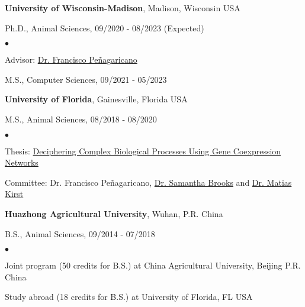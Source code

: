 \documentclass[margin,line,10pt]{res}
\newenvironment{list1}{
  \begin{list}{\ding{113}}{%
      \setlength{\itemsep}{0in}
      \setlength{\parsep}{0in} \setlength{\parskip}{0in}
      \setlength{\topsep}{0in} \setlength{\partopsep}{0in} 
      \setlength{\leftmargin}{0.17in}}}{\end{list}}
\newenvironment{list2}{
  \begin{list}{$\bullet$}{%
      \setlength{\itemsep}{0in}
      \setlength{\parsep}{0in} \setlength{\parskip}{0in}
      \setlength{\topsep}{0in} \setlength{\partopsep}{0in} 
      \setlength{\leftmargin}{0.2in}}}{\end{list}}
\begin{document}
\begin{resume}
{\bf University of Wisconsin-Madison}, Madison, Wisconsin USA\\
\vspace*{-.1in}
\begin{list1}
\item[] Ph.D., Animal Sciences, 09/2020 - 08/2023 (Expected)
\begin{list2}
\vspace*{.05in}
\item Advisor: \textcolor{blue}{\href{https://andysci.wisc.edu/directory/francisco-penagaricano/}{Dr. Francisco Peñagaricano}} 
\end{list2}
\vspace*{.03in}
\item[] M.S., Computer Sciences, 09/2021 - 05/2023
\vspace*{.03in}
\end{list1}

{\bf University of Florida}, Gainesville, Florida USA\\
\vspace*{-.1in}
\begin{list1}
\item[] M.S., Animal Sciences,  08/2018 - 08/2020
\begin{list2}
\vspace*{.05in}
\item Thesis: \textcolor{blue}{\href{https://ufdcimages.uflib.ufl.edu/UF/E0/05/69/10/00001/Liu_L.pdf}{Deciphering Complex Biological Processes Using Gene Coexpression Networks }} 
\item Committee: Dr. Francisco Peñagaricano, \textcolor{blue}{\href{https://animal.ifas.ufl.edu/people/samantha-brooks/}{Dr. Samantha Brooks}} and \textcolor{blue}{\href{https://ffgs.ifas.ufl.edu/faculty/kirst-matias/}{Dr. Matias Kirst}} 
\end{list2}
\vspace*{.02in}
\end{list1}

{\bf Huazhong Agricultural University}, Wuhan, P.R. China\\
\vspace*{-.1in}
\begin{list1}
\item[] B.S., Animal Sciences, 09/2014 - 07/2018
\begin{list2}
\vspace*{.05in}
\item Joint program (50 credits for B.S.) at China Agricultural University, Beijing P.R. China
\item Study abroad (18 credits for B.S.) at University of Florida, FL USA
\end{list2}
\vspace*{.02in}
\end{list1}



\end{resume}
\end{document}
